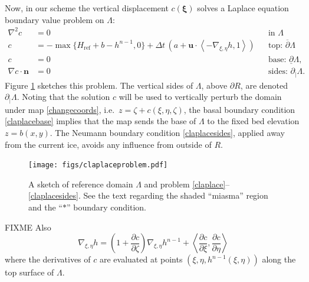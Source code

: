\documentclass[letterpaper,final,12pt,reqno]{amsart}
\newcommand{\grad}{\nabla}
\newcommand{\bn}{\mathbf{n}}
\newcommand{\bu}{\mathbf{u}}
\newcommand{\bxi}{\bm{\xi}}
\newcommand{\Href}{H_{\text{ref}}}
\begin{document}
Now, in our scheme the vertical displacement $c(\bxi)$ solves a Laplace equation boundary value problem on $\Lambda$:
\begin{align}
        \grad^2 c &= 0 &&\text{in } \Lambda \label{claplace} \\
                c &= -\max\{\Href + b - h^{n-1},0\} + \Delta t\,(a + \bu \cdot \left<-\grad_{\xi,\eta}h,1\right>) &&\text{top: } \overline{\partial} \Lambda  \label{claplacetop} \\
                c &= 0 &&\text{base: } \underline{\partial} \Lambda,  \label{claplacebase} \\
 \grad c\cdot \bn &= 0 &&\text{sides: } \partial_{|} \Lambda.  \label{claplacesides}
\end{align}
Figure \ref{fig:claplaceproblem} sketches this problem.  The vertical sides of $\Lambda$, above $\partial R$, are denoted $\partial_{|} \Lambda$.  Noting that the solution $c$ will be used to vertically perturb the domain under map \eqref{changecoords}, i.e.~$z=\zeta+c(\xi,\eta,\zeta)$, the basal boundary condition \eqref{claplacebase} implies that the map sends the base of $\Lambda$ to the fixed bed elevation $z=b(x,y)$.  The Neumann boundary condition \eqref{claplacesides}, applied away from the current ice, avoids any influence from outside of $R$.

\begin{figure}[ht]
\begin{center}
\texttt{[image: figs/claplaceproblem.pdf]}
\end{center}
\caption{A sketch of reference domain $\Lambda$ and problem \eqref{claplace}--\eqref{claplacesides}.  See the text regarding the shaded ``miasma'' region and the ``$\ast$'' boundary condition.}
\label{fig:claplaceproblem}
\end{figure}

FIXME  Also
\begin{equation}
\grad_{\xi,\eta} h = \left(1+\frac{\partial c}{\partial\zeta}\right) \grad_{\xi,\eta} h^{n-1} + \left<\frac{\partial c}{\partial\xi},\frac{\partial c}{\partial\eta}\right> \label{hgradient}
\end{equation}
where the derivatives of $c$ are evaluated at points $(\xi,\eta,h^{n-1}(\xi,\eta))$ along the top surface of $\Lambda$.
\end{document}
